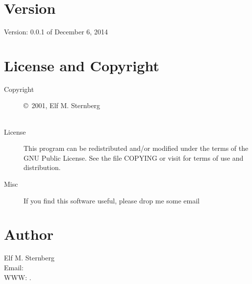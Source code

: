 \documentclass[english]{article}
\begin{document}
\section{Version}
Version: 0.0.1 of December 6, 2014

\section{License and Copyright}

\begin{description}
\item[Copyright] \copyright\ 2001, Elf M. Sternberg \\
          \\

\item[License] This program can be redistributed and/or modified under the
  terms of the GNU Public License.  See the file COPYING or visit
   for terms of use and
  distribution.

\item[Misc] If you find this software useful, please drop me some email
\end{description}

\section{Author}

\noindent
Elf M. Sternberg                      \\
Email:         \\
WWW: .
\LatexManEnd
\end{document}
